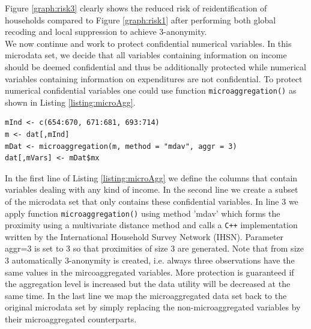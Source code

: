 \documentclass[12pt]{article}
\begin{document}
Figure \ref{graph:risk3} clearly shows the reduced risk of reidentification of households compared to Figure \ref{graph:risk1} after performing both global recoding and local suppression to achieve 3-anonymity. \\

We now continue and work to protect confidential numerical variables. 
In this microdata set, we decide that all variables containing information on 
income should be deemed confidential and thus be additionally protected while 
numerical variables containing information on expenditures are not confidential. 
To protect numerical confidential variables one could use function 
\lstinline{microaggregation()} as shown in Listing \ref{listing:microAgg}. 

\begin{lstlisting}[captionpos=b, caption={Microaggregation for confidential numerical variables}, label=listing:microAgg]
mInd <- c(654:670, 671:681, 693:714)
m <- dat[,mInd] 
mDat <- microaggregation(m, method = "mdav", aggr = 3)
dat[,mVars] <- mDat$mx 
\end{lstlisting}
In the first line of Listing \ref{listing:microAgg} we define the 
columns that contain variables dealing with any kind of income. In the second line 
we create a subset of the microdata set that only contains these confidential variables. 
In line 3 we apply function \lstinline{microaggregation()} using method 'mdav' 
which forms the proximity using a multivariate distance method and calls a \texttt{C++} 
implementation written by the International Household Survey Network (IHSN).
Parameter aggr=3 is set to 3 so that proximities of size 3 are generated. Note that from size 3 automatically 
$3$-anonymity is created, i.e. always three observations have the same values in the mircoaggregated variables. 
More protection is guaranteed if the aggregation level is increased but the data utility will be decreased at the same time.
In the last line we map the microaggregated data set back to the original microdata set by simply replacing the non-microaggregated variables by their microaggregated counterparts.\\
\end{document}
